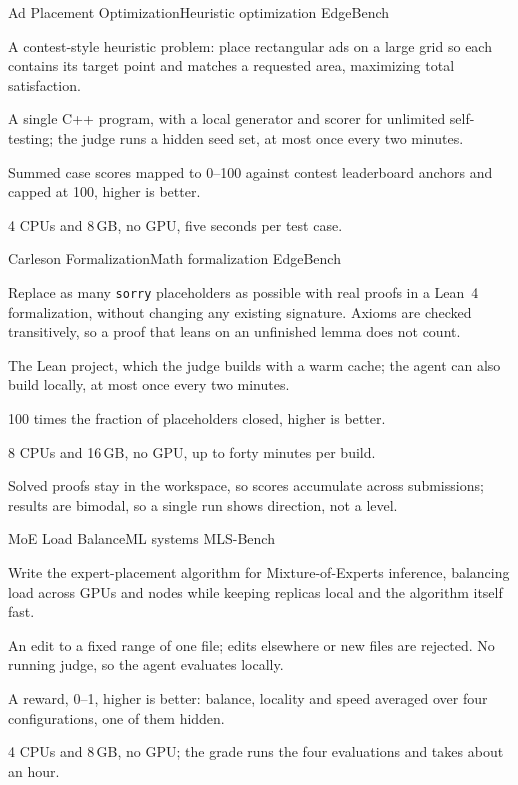 \documentclass[numbers,10pt]{arxiv}
\newenvironment{cardfields}{\begin{description}[style=sameline, leftmargin=5.9em, labelwidth=5.5em, labelsep=0.4em,
  font=\sffamily\footnotesize\bfseries, itemsep=1pt, parsep=0pt, topsep=1pt, partopsep=0pt]\small}{\end{description}}
\begin{document}
\begin{taskcard}{Ad Placement Optimization}{Heuristic optimization \textperiodcentered{} EdgeBench}
\begin{cardfields}
\item[Goal] A contest-style heuristic problem: place rectangular ads on a large grid so each contains its target point and matches a requested area, maximizing total satisfaction.
\item[Submission] A single C++ program, with a local generator and scorer for unlimited self-testing; the judge runs a hidden seed set, at most once every two minutes.
\item[Score] Summed case scores mapped to 0--100 against contest leaderboard anchors and capped at 100, higher is better.
\item[Judge] 4 CPUs and 8\,GB, no GPU, five seconds per test case.
\end{cardfields}
\end{taskcard}
\begin{taskcard}{Carleson Formalization}{Math formalization \textperiodcentered{} EdgeBench}
\begin{cardfields}
\item[Goal] Replace as many \texttt{sorry} placeholders as possible with real proofs in a Lean~4 formalization, without changing any existing signature. Axioms are checked transitively, so a proof that leans on an unfinished lemma does not count.
\item[Submission] The Lean project, which the judge builds with a warm cache; the agent can also build locally, at most once every two minutes.
\item[Score] 100 times the fraction of placeholders closed, higher is better.
\item[Judge] 8 CPUs and 16\,GB, no GPU, up to forty minutes per build.
\item[Notes] Solved proofs stay in the workspace, so scores accumulate across submissions; results are bimodal, so a single run shows direction, not a level.
\end{cardfields}
\end{taskcard}
\begin{taskcard}{MoE Load Balance}{ML systems \textperiodcentered{} MLS-Bench}
\begin{cardfields}
\item[Goal] Write the expert-placement algorithm for Mixture-of-Experts inference, balancing load across GPUs and nodes while keeping replicas local and the algorithm itself fast.
\item[Submission] An edit to a fixed range of one file; edits elsewhere or new files are rejected. No running judge, so the agent evaluates locally.
\item[Score] A reward, 0--1, higher is better: balance, locality and speed averaged over four configurations, one of them hidden.
\item[Judge] 4 CPUs and 8\,GB, no GPU; the grade runs the four evaluations and takes about an hour.
\end{cardfields}
\end{taskcard}
\end{document}
